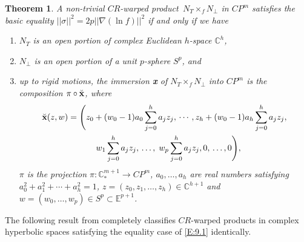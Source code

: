 \documentclass{amsart}
\theoremstyle{plain}
\newtheorem{theorem}{Theorem}[section]
\numberwithin{equation}{section}
\theoremstyle{remark}
\numberwithin{equation}{section}
\begin{document}
\begin{theorem}\label{T:9.4}  A non-trivial $CR$-warped product $\,N_T\times_{f} N_\perp$   in $CP^m$ satisfies the basic equality $||\sigma||^2= 2p||\nabla (\ln f)||^2$ if and only if we have
\begin{enumerate}
\item  $N_T$ is an open portion of complex Euclidean $h$-space ${\mathbb C}^h$,

\item $N_\perp$ is an open portion of a unit $p$-sphere $S^p$, and

\item up to rigid motions, the immersion {\bf x} of $N_T\times_{f} N_\perp$ into $CP^m$ is the composition $\pi\circ\breve{\hbox{\bf x}}$, where 
\begin{align}\notag  \breve{\hbox{\bf x}}&(z,w)=\Bigg( z_0+(w_0-1)a_0\sum_{j=0}^h a_j z_j,\,\cdots ,z_h+(w_0-1)a_h\sum_{j=0}^h a_jz_j,\\&\hskip.8inw_1\sum_{j=0}^h a_jz_j,\,\ldots,\;w_p\sum_{j=0}^h
a_jz_j,0,\,\ldots,0\Bigg),\notag\end{align} 
$\pi$ is the projection $\pi:{\mathbb C}^{m+1}_*\to CP^m$, $a_0,\ldots,a_h$ are real numbers satisfying $a_0^2+a_1^2+\cdots+a_h^2=1$, $z=(z_0,z_1,\ldots,z_h)\in {\mathbb C}^{h+1}$ and $w=(w_0,\ldots,w_p)\in S^p\subset {\mathbb E}^{p+1}$.
\end{enumerate} \end{theorem} 

The following result from \cite{c8} completely classifies  $CR$-warped products in complex hyperbolic spaces satisfying the equality case of \eqref{E:9.1} identically.
\end{document}
